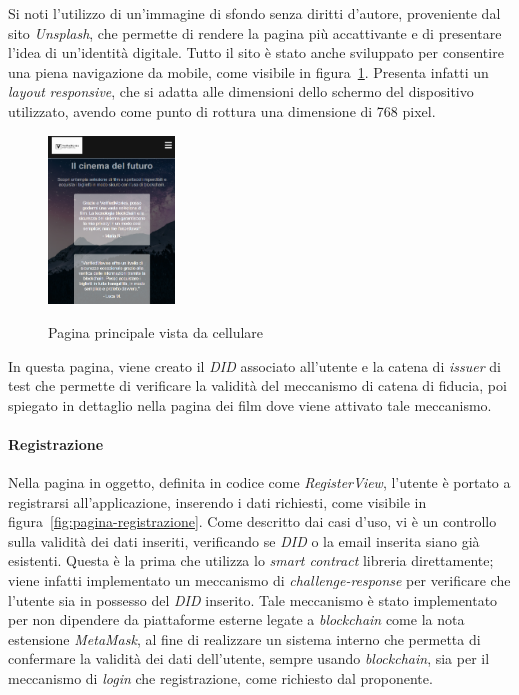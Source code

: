 Si noti l'utilizzo di un'immagine di sfondo senza diritti d'autore, proveniente dal sito \textit{Unsplash}, che permette di rendere la pagina più accattivante e di presentare l'idea di un'identità digitale.
Tutto il sito è stato anche sviluppato per consentire una piena navigazione da mobile, come visibile in figura~\ref{fig:pagina-principale-mobile}.
Presenta infatti un \textit{layout} \textit{responsive}, che si adatta alle dimensioni dello schermo del dispositivo utilizzato, avendo come punto di rottura una dimensione 
di 768 pixel.
\begin{figure}[ht]
    \centering
    \includegraphics[width=0.3\textwidth, alt={Pagina principale dell'applicazione vista da cellulare}]{immagini/frontend/home-mobile.png}
    \caption{Pagina principale vista da cellulare}\label{fig:pagina-principale-mobile}
\end{figure}

In questa pagina, viene creato il \textit{DID} associato all'utente e la catena di \textit{issuer} di test che permette di verificare la validità del meccanismo di catena di fiducia,
poi spiegato in dettaglio nella pagina dei film dove viene attivato tale meccanismo.

\paragraph{Registrazione}\label{par:registrazione}

Nella pagina in oggetto, definita in codice come \textit{RegisterView}, l'utente è portato a registrarsi all'applicazione, inserendo i dati richiesti, come visibile in figura~\ref{fig:pagina-registrazione}.
Come descritto dai casi d'uso, vi è un controllo sulla validità dei dati inseriti, verificando se \textit{DID} o la email inserita siano già esistenti.
Questa è la prima che utilizza lo \textit{smart contract} libreria direttamente; viene infatti implementato un meccanismo di \textit{challenge-response}
per verificare che l'utente sia in possesso del \textit{DID} inserito. Tale meccanismo è stato implementato per non dipendere da piattaforme esterne legate a \textit{blockchain}
come la nota estensione \textit{MetaMask}, al fine di realizzare un sistema interno che permetta di confermare la validità dei dati dell'utente, sempre usando \textit{blockchain},
sia per il meccanismo di \textit{login} che registrazione, come richiesto dal proponente. 

